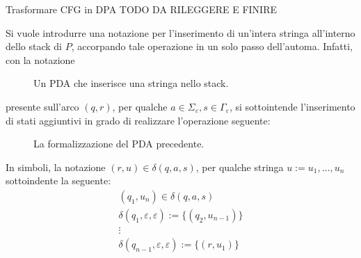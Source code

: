 \documentclass[a4paper, 12pt]{report}
\begin{document}
    \begin{framedmeth}[breakable]{Trasformare CFG in DPA}
        \label{cfg into pda}
        TODO DA RILEGGERE E FINIRE

        Si vuole introdurre una notazione per l'inserimento di un'intera stringa all'interno dello stack di $P$, accorpando tale operazione in un solo passo dell'automa. Infatti, con la notazione

        \begin{figure}[H]
            \centering
             \caption{Un PDA che inserisce una stringa nello stack.}
        \end{figure}

        presente sull'arco $(q, r)$, per qualche $a \in \Sigma_\varepsilon, s \in \Gamma_\varepsilon$, si sottointende l'inserimento di stati aggiuntivi in grado di realizzare l'operazione seguente:

        \begin{figure}[H]
            \centering
             \caption{La formalizzazione del PDA precedente.}
        \end{figure}

        In simboli, la notazione $(r, u) \in \delta(q, a, s)$, per qualche stringa $u := u_1, \ldots, u_n$ sottoindente la seguente: $$\begin{array}{c} (q_1, u_n) \in \delta(q, a, s) \\ \delta(q_1, \varepsilon, \varepsilon) := \{(q_2, u_{n - 1}) \}\\ \vdots \\ \delta(q_{n - 1}, \varepsilon, \varepsilon) := \{(r, u_1)\} \end{array}$$


\end{framedmeth}
\end{document}
